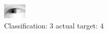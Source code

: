 \begin{figure}[h!]
\begin{center}
\includegraphics[width=0.60\columnwidth]{figures/ID2425_class_3_target_4.png}
\end{center}
\caption{ Classification: 3 actual target: 4}
\label{fig:ID2425_class_3_target_4}
\end{figure}
